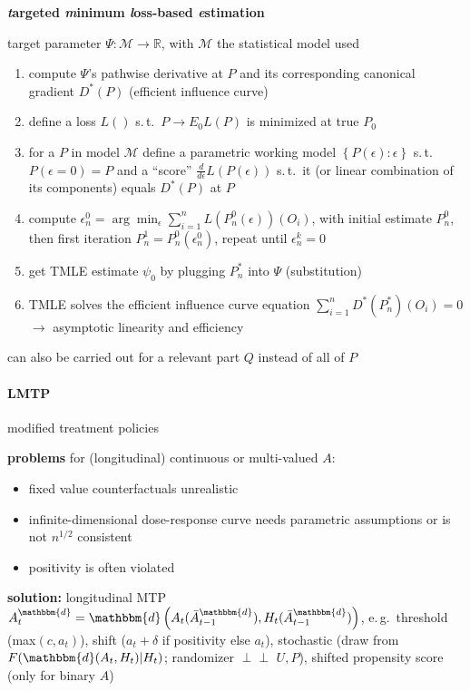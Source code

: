 \documentclass[8pt,twoside]{extarticle}
\newcommand{\indep}{\perp \!\!\! \perp}
\begin{document}
\begin{multicols}{2}
\noindent \textbf{\textit{t}argeted \textit{m}inimum \textit{l}oss-based \textit{e}stimation}


\noindent target parameter $\Psi: \mathcal{M} \to \mathbb{R}$, with $\mathcal{M}$ the statistical model used

\begin{enumerate}[leftmargin=*, itemsep=0em, topsep=0pt, partopsep=0pt,parsep=0pt]
\item compute $\Psi$'s pathwise derivative at $P$ and its corresponding canonical gradient $D^*(P)$ (efficient influence curve)
\item define a loss $L()$ s.\,t.\ $P\to E_0L(P)$ is minimized at true $P_0$ 
\item for a $P$ in model $\mathcal{M}$ define a parametric working model $\left\{P(\epsilon):\epsilon\right\}$ s.\,t.\ $P(\epsilon=0)=P$ and a ``score'' $\frac{d}{d\epsilon}L(P(\epsilon))$ s.\,t.\ it (or linear combination of its components) equals $D^*(P)$ at $P$ 
\item  compute $\epsilon_n^0{=}\arg\min_\epsilon\! \sum_{i=1}^n \! L(P_n^0(\epsilon))(O_i)$, with initial estimate $P_n^0$, then  first iteration $P^1_n=P_n^0(\epsilon_n^0)$, repeat until $\epsilon^k_n=0$ 
\item get TMLE estimate $\psi_0$ by plugging $P^*_n$ into $\Psi$ (substitution)
\item  TMLE solves the efficient influence curve equation $\sum_{i=1}^n D^*(P^*_n)(O_i)=0$ $\to$ asymptotic linearity and efficiency
\end{enumerate}
can also be carried out for a relevant part $Q$ instead of all of $P$





\paragraph{LMTP}  \citep{diaz2021nonparametric} modified treatment policies


\noindent \textbf{problems} for (longitudinal) continuous or multi-valued $A$:
\begin{itemize}[leftmargin=*, itemsep=0em, topsep=0pt, partopsep=0pt,parsep=0pt]
\item fixed value counterfactuals unrealistic
\item infinite-dimensional dose-response curve needs parametric assumptions or is not $n^{1/2}$ consistent
\item positivity is often violated 
\end{itemize}
\textbf{solution:} longitudinal MTP $A_t^{\mathbbm{d}} = \mathbbm{d}\left(A_t(\bar{A}_{t-1}^{\mathbbm{d}}), H_t(\bar{A}_{t-1}^\mathbbm{d})\right)$, e.\,g.\ threshold (max$(c,a_t)$), shift ($a_t + \delta$ if positivity else $a_t$), stochastic (draw from $F(\mathbbm{d}(A_t,H_t)|H_t)$; randomizer $\indep$ $U, P$), shifted propensity score (only for binary $A$)


\end{multicols}
\end{document}
